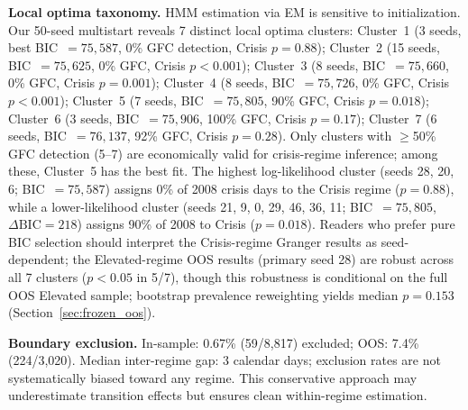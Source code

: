 \documentclass[sigconf,anonymous]{acmart}
\begin{document}
\textbf{Local optima taxonomy.}
HMM estimation via EM is sensitive to initialization. Our 50-seed multistart
reveals 7 distinct local optima clusters:
Cluster~1 (3 seeds, best BIC~$= 75{,}587$, 0\% GFC detection, Crisis $p = 0.88$);
Cluster~2 (15 seeds, BIC~$= 75{,}625$, 0\% GFC, Crisis $p < 0.001$);
Cluster~3 (8 seeds, BIC~$= 75{,}660$, 0\% GFC, Crisis $p = 0.001$);
Cluster~4 (8 seeds, BIC~$= 75{,}726$, 0\% GFC, Crisis $p < 0.001$);
Cluster~5 (7 seeds, BIC~$= 75{,}805$, 90\% GFC, Crisis $p = 0.018$);
Cluster~6 (3 seeds, BIC~$= 75{,}906$, 100\% GFC, Crisis $p = 0.17$);
Cluster~7 (6 seeds, BIC~$= 76{,}137$, 92\% GFC, Crisis $p = 0.28$).
Only clusters with $\geq$50\% GFC detection (5--7) are economically valid for
crisis-regime inference; among these, Cluster~5 has the best fit.
The highest log-likelihood cluster (seeds 28, 20, 6; BIC~$= 75{,}587$)
assigns 0\% of 2008 crisis days to the Crisis regime ($p = 0.88$),
while a lower-likelihood cluster (seeds 21, 9, 0, 29, 46, 36, 11;
BIC~$= 75{,}805$, $\Delta\text{BIC} = 218$) assigns 90\% of 2008 to Crisis
($p = 0.018$). Readers who prefer pure BIC selection should interpret the
Crisis-regime Granger results as seed-dependent; the Elevated-regime OOS results
(primary seed 28) are robust across all 7 clusters ($p < 0.05$ in 5/7),
though this robustness is conditional on the full OOS Elevated sample;
bootstrap prevalence reweighting yields median $p = 0.153$
(Section~\ref{sec:frozen_oos}).

\textbf{Boundary exclusion.}
In-sample: 0.67\% (59/8,817) excluded; OOS: 7.4\% (224/3,020).
Median inter-regime gap: 3 calendar days; exclusion rates are not
systematically biased toward any regime. This conservative approach
may underestimate transition effects but ensures clean within-regime estimation.


\end{document}
